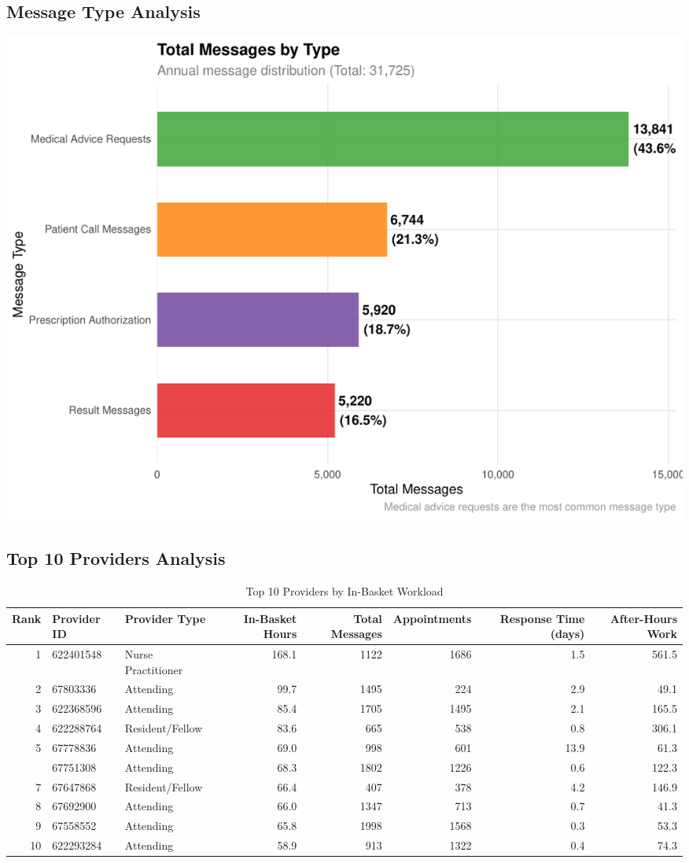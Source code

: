 \documentclass[
  11pt,
]{article}
\begin{document}
\subsection{Message Type Analysis}\label{message-type-analysis}

\begin{center}
\includegraphics[width=1\textwidth,height=\textheight]{comprehensive-analysis-report_files/figure-pdf/message-analysis-1.pdf}
\end{center}

\subsection{Top 10 Providers Analysis}\label{top-10-providers-analysis}

\begin{longtable}[t]{rllrrrrr}
\caption{\label{tab:top-10-analysis}Top 10 Providers by In-Basket Workload}\\
\toprule
Rank & Provider ID & Provider Type & In-Basket Hours & Total Messages & Appointments & Response Time (days) & After-Hours Work\\
\midrule
1 & 622401548 & Nurse Practitioner & 168.1 & 1122 & 1686 & 1.5 & 561.5\\
2 & 67803336 & Attending & 99.7 & 1495 & 224 & 2.9 & 49.1\\
3 & 622368596 & Attending & 85.4 & 1705 & 1495 & 2.1 & 165.5\\
4 & 622288764 & Resident/Fellow & 83.6 & 665 & 538 & 0.8 & 306.1\\
5 & 67778836 & Attending & 69.0 & 998 & 601 & 13.9 & 61.3\\
\addlinespace
6 & 67751308 & Attending & 68.3 & 1802 & 1226 & 0.6 & 122.3\\
7 & 67647868 & Resident/Fellow & 66.4 & 407 & 378 & 4.2 & 146.9\\
8 & 67692900 & Attending & 66.0 & 1347 & 713 & 0.7 & 41.3\\
9 & 67558552 & Attending & 65.8 & 1998 & 1568 & 0.3 & 53.3\\
10 & 622293284 & Attending & 58.9 & 913 & 1322 & 0.4 & 74.3\\
\bottomrule
\end{longtable}
\end{document}
